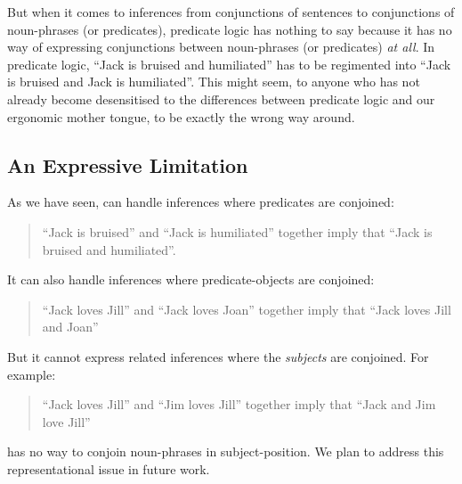 But when it comes to inferences from conjunctions of sentences to conjunctions of noun-phrases (or predicates), predicate logic has nothing to say because it has no way of expressing conjunctions between noun-phrases (or predicates) \emph{at all}. In predicate logic, ``Jack is bruised and humiliated'' has to be regimented into ``Jack is bruised and Jack is humiliated''. 
This might seem, to anyone who has not already become desensitised to the differences between predicate logic and our ergonomic mother tongue, to be exactly the wrong way around.

\subsection{An Expressive Limitation}
As we have seen, \ELFULL{} can handle inferences where predicates are conjoined:
\begin{quote}
``Jack is bruised'' and ``Jack is humiliated'' together imply that ``Jack is bruised and humiliated''.
\end{quote}
It can also handle inferences where predicate-objects are conjoined:
\begin{quote}
``Jack loves Jill'' and ``Jack loves Joan'' together imply that ``Jack loves Jill and Joan''
\end{quote}
But it cannot express related inferences where the \emph{subjects} are conjoined. For example:
\begin{quote}
``Jack loves Jill'' and ``Jim loves Jill'' together imply that ``Jack and Jim love Jill''
\end{quote}
\ELFULL{} has no way to conjoin noun-phrases in subject-position.
We plan to address this representational issue in future work.